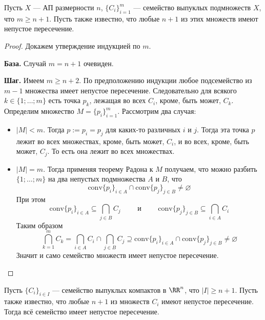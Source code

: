\documentclass[12pt,a4paper]{article}
\newcommand{\conv}{\ensuremath{\mathrm{conv}}\xspace}
\begin{document}
    \begin{theorem}[Хелли]
        Пусть $X$ --- АП размерности $n$, $\{C_i\}_{i=1}^m$ --- семейство выпуклых подмножеств $X$, что $m \geqslant n + 1$. Пусть также известно, что любые $n+1$ из этих множеств имеют непустое пересечение. 
    \end{theorem}

    \begin{proof}
        Докажем утверждение индукцией по $m$.

        \textbf{База.} Случай $m = n + 1$ очевиден.

        \textbf{Шаг.} Имеем $m \geqslant n + 2$. По предположению индукции любое подсемейство из $m-1$ множества имеет непустое пересечение. Следовательно для всякого $k \in \{1; \dots; m\}$ есть точка $p_k$, лежащая во всех $C_i$, кроме, быть может, $C_k$. Определим множество $M = \{p_i\}_{i=1}^m$. Рассмотрим два случая:
        \begin{itemize}
            \item $|M| < m$. Тогда $p := p_i = p_j$ для каких-то различных $i$ и $j$. Тогда эта точка $p$ лежит во всех множествах, кроме, быть может, $C_i$, и во всех, кроме, быть может, $C_j$. То есть она лежит во всех множествах.
            \item $|M| = m$. Тогда применяя теорему Радона к $M$ получаем, что можно разбить $\{1; \dots; m\}$ на два непустых подмножества $A$ и $B$, что
                \[\conv \{p_i\}_{i \in A} \cap \conv \{p_j\}_{j \in B} \neq \varnothing\]
                При этом
                \[
                    \conv \{p_i\}_{i \in A} \subseteq \bigcap_{j \in B} C_j
                    \qquad \text{ и } \qquad
                    \conv \{p_j\}_{j \in B} \subseteq \bigcap_{i \in A} C_i
                \]
                Таким образом
                \[
                    \bigcap_{k=1}^m C_k
                    = \bigcap_{i \in A} C_i \cap \bigcap_{j \in B} C_j
                    \supseteq \conv \{p_i\}_{i \in A} \cap \conv \{p_j\}_{j \in B}
                    \neq \varnothing
                \]
                Значит и само семейство множеств имеет непустое пересечение.
        \end{itemize}
    \end{proof}

    \begin{corollary}
        Пусть $\{C_i\}_{i \in I}$ --- семейство выпуклых компактов в $\RR^n$, что $|I| \geqslant n+1$. Пусть также известно, что любые $n+1$ из множеств $C_i$ имеют непустое пересечение. Тогда всё семейство имеет непустое пересечение.
    \end{corollary}
\end{document}
